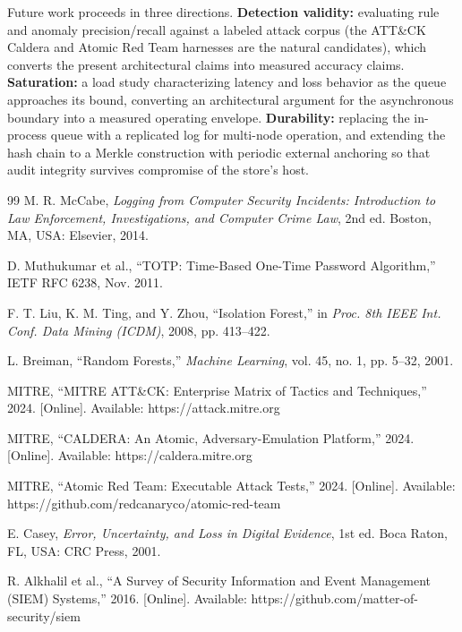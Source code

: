 \documentclass[conference]{IEEEtran}
\begin{document}
Future work proceeds in three directions. \textbf{Detection validity:}
evaluating rule and anomaly precision/recall against a labeled attack corpus
(the ATT\&CK Caldera and Atomic Red Team harnesses are the natural
candidates), which converts the present architectural claims into measured
accuracy claims. \textbf{Saturation:} a load study characterizing latency
and loss behavior as the queue approaches its bound, converting an
architectural argument for the asynchronous boundary into a measured
operating envelope. \textbf{Durability:} replacing the in-process queue with
a replicated log for multi-node operation, and extending the hash chain to a
Merkle construction with periodic external anchoring so that audit integrity
survives compromise of the store's host.

\begin{thebibliography}{99}
M. R. McCabe, \emph{Logging from Computer Security Incidents: Introduction to Law Enforcement, Investigations, and Computer Crime Law}, 2nd ed. Boston, MA, USA: Elsevier, 2014.

D. Muthukumar et al., ``TOTP: Time-Based One-Time Password Algorithm,'' IETF RFC 6238, Nov. 2011.

F. T. Liu, K. M. Ting, and Y. Zhou, ``Isolation Forest,'' in \emph{Proc. 8th IEEE Int. Conf. Data Mining (ICDM)}, 2008, pp. 413--422.

L. Breiman, ``Random Forests,'' \emph{Machine Learning}, vol. 45, no. 1, pp. 5--32, 2001.

MITRE, ``MITRE ATT\&CK: Enterprise Matrix of Tactics and Techniques,'' 2024. [Online]. Available: https://attack.mitre.org

MITRE, ``CALDERA: An Atomic, Adversary-Emulation Platform,'' 2024. [Online]. Available: https://caldera.mitre.org

MITRE, ``Atomic Red Team: Executable Attack Tests,'' 2024. [Online]. Available: https://github.com/redcanaryco/atomic-red-team

E. Casey, \emph{Error, Uncertainty, and Loss in Digital Evidence}, 1st ed. Boca Raton, FL, USA: CRC Press, 2001.

R. Alkhalil et al., ``A Survey of Security Information and Event Management (SIEM) Systems,'' 2016. [Online]. Available: https://github.com/matter-of-security/siem

\end{thebibliography}
\end{document}
